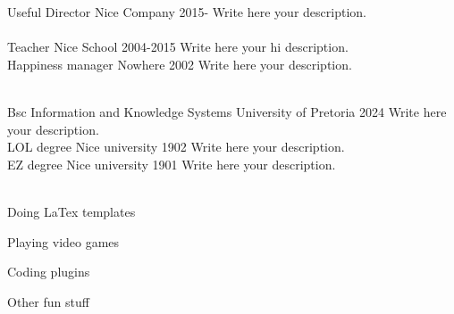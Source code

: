 \documentclass[11pt]{spidercv}
\begin{document}




\begin{MainPart}

	\Experience
	{\ColorHighlight}
	{Useful Director}
	{Nice Company}
	{2015-\faUndo}
	{
		Write here your description.\\
		\lorem\\
		\lorem
	}
	\Experience
	{\ColorHighlight}
	{Teacher}
	{Nice School}
	{2004-2015}
	{
		Write here your hi description.\\
		\lorem
	}
	\Experience
	{\ColorHighlight}
	{Happiness manager}
	{Nowhere}
	{2002}
	{
		Write here your description.\\
		\lorem\\
		\lorem
	}



	\Experience
	{\ColorHighlight}
	{Bsc Information and Knowledge Systems}
	{University of Pretoria}
	{2024}
	{
		Write here your description.\\
		\lorem
	}
	\Experience
	{\ColorHighlight}
	{LOL degree}
	{Nice university}
	{1902}
	{
		Write here your description.\\
		\lorem
	}
	\Experience
	{\ColorHighlight}
	{EZ degree}
	{Nice university}
	{1901}
	{
		Write here your description.\\
		\lorem\\
		\lorem
	}


	\vspace*{0.5cm}
	\begin{DoubleColumns}
		\begin{ItemList}{\ColorHighlight}
			\item [] Doing LaTex templates
			\item [] Playing video games
			\item Coding plugins
		\end{ItemList}
		\nextcolumn
		\begin{ItemList}{\ColorHighlight}
			\item [] Other fun stuff
		\end{ItemList}
	\end{DoubleColumns}

\end{MainPart}
\end{document}
